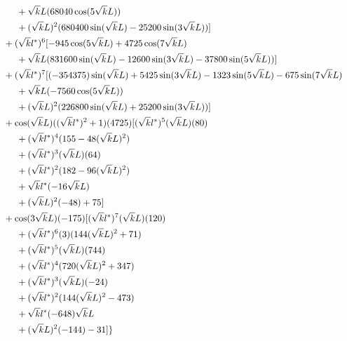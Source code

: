 {\begin{align*}
        &\hspace{1cm}     +\sqrt{k}L  (68040 \cos(5\sqrt{k}L))\\
        &\hspace{1cm}     +(\sqrt{k}L)^2 (680400 \sin(\sqrt{k}L)-25200 \sin(3\sqrt{k}L))]\\
        &\hspace{0.5cm}+(\sqrt{k}l^*)^6 [-945 \cos(5\sqrt{k}L)+4725 \cos(7\sqrt{k}L)\\
        &\hspace{1cm}     +\sqrt{k}L  (831600 \sin(\sqrt{k}L)-12600 \sin(3\sqrt{k}L)-37800 \sin(5\sqrt{k}L))]\\
        &\hspace{0.5cm}+(\sqrt{k}l^*)^7 [(-354375) \sin(\sqrt{k}L) + 5425 \sin(3\sqrt{k}L)-1323 \sin(5\sqrt{k}L)-675 \sin(7\sqrt{k}L)\\
        &\hspace{1cm}+\sqrt{k}L  (-7560 \cos(5\sqrt{k}L))\\
        &\hspace{1cm}+(\sqrt{k}L)^2 (226800 \sin(\sqrt{k}L) + 25200 \sin(3\sqrt{k}L))]\\
        &\hspace{0.5cm}+\cos(\sqrt{k}L) ((\sqrt{k}l^*)^2+1)(4725)[(\sqrt{k}l^*)^5(\sqrt{k}L)(80)\\
        &\hspace{1cm}     +(\sqrt{k}l^*)^4 (155-48(\sqrt{k}L)^2)\\
        &\hspace{1cm}     +(\sqrt{k}l^*)^3 (\sqrt{k}L)(64)\\
        &\hspace{1cm}     +(\sqrt{k}l^*)^2 (182-96 (\sqrt{k}L)^2)\\
        &\hspace{1cm}     +\sqrt{k}l^*  (-16 \sqrt{k}L)\\
        &\hspace{1cm}     +(\sqrt{k}L)^2 (-48)+75]\\
        &\hspace{0.5cm}+\cos(3\sqrt{k}L) (-175) [(\sqrt{k}l^*)^7 (\sqrt{k}L) (120)\\
        &\hspace{1cm}    +(\sqrt{k}l^*)^6(3)(144(\sqrt{k}L)^2+71)\\
        &\hspace{1cm}    +(\sqrt{k}l^*)^5 (\sqrt{k}L) (744)\\
        &\hspace{1cm}    +(\sqrt{k}l^*)^4 (720(\sqrt{k}L)^2+347)\\
        &\hspace{1cm}    +(\sqrt{k}l^*)^3 (\sqrt{k}L)(-24)\\
        &\hspace{1cm}    +(\sqrt{k}l^*)^2 (144 (\sqrt{k}L)^2-473)\\
        &\hspace{1cm}    +\sqrt{k}l^* (-648) \sqrt{k}L\\
        &\hspace{1cm}    +(\sqrt{k}L)^2 (-144)-31]\}
 \end{align*}
}
